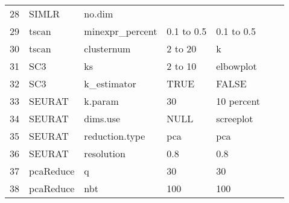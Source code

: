 \documentclass[11pt, a4paper]{article}\usepackage[]{graphicx}\usepackage[]{color}
\begin{document}
\begin{table}[ht]
\begin{tabular}{rllllll}
  28 & SIMLR & no.dim &  &  &  &  \\ 
  29 & tscan & minexpr\_percent & 0.1 to 0.5 & 0.1 to 0.5 &  &  \\ 
  30 & tscan & clusternum & 2 to 20 & k &  &  \\ 
  31 & SC3 & ks & 2 to 10 & elbowplot &  &  \\ 
  32 & SC3 & k\_estimator & TRUE & FALSE &  &  \\ 
  33 & SEURAT & k.param & 30 & 10 percent &  &  \\ 
  34 & SEURAT & dims.use & NULL & screeplot &  &  \\ 
  35 & SEURAT & reduction.type & pca & pca &  &  \\ 
  36 & SEURAT & resolution & 0.8 & 0.8 &  &  \\ 
  37 & pcaReduce & q & 30 & 30 &  &  \\ 
  38 & pcaReduce & nbt & 100 & 100 &  &  \\ 
   \hline
\end{tabular}
\end{table}

\clearpage


\end{document}
